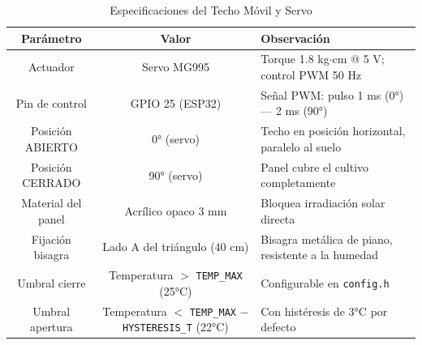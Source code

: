 \begin{table}[tp]
\centering
\renewcommand{\arraystretch}{1.3}
\caption{Especificaciones del Techo Móvil y Servo}
\label{tab:techo_servo}
\begin{tabularx}{\textwidth}{|c|c|X|}
\hline
\textbf{Parámetro} & \textbf{Valor} & \textbf{Observación} \\
\hline
Actuador & Servo MG995 & Torque 1.8 kg$\cdot$cm @ 5 V; control PWM 50 Hz \\
\hline
Pin de control & GPIO 25 (ESP32) & Señal PWM: pulso 1 ms (0°) --- 2 ms (90°) \\
\hline
Posición ABIERTO & 0° (servo) & Techo en posición horizontal, paralelo al suelo \\
\hline
Posición CERRADO & 90° (servo) & Panel cubre el cultivo completamente \\
\hline
Material del panel & Acrílico opaco 3 mm & Bloquea irradiación solar directa \\
\hline
Fijación bisagra & Lado A del triángulo (40 cm) & Bisagra metálica de piano, resistente a la humedad \\
\hline
Umbral cierre & Temperatura $>$ \texttt{TEMP\_MAX} (25°C) & Configurable en \texttt{config.h} \\
\hline
Umbral apertura & Temperatura $<$ \texttt{TEMP\_MAX} $-$ \texttt{HYSTERESIS\_T} (22°C) & Con histéresis de 3°C por defecto \\
\hline
\end{tabularx}
\end{table}